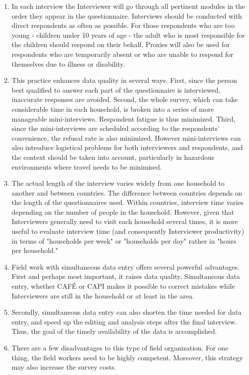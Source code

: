 \documentclass[
]{article}
\begin{document}
\begin{enumerate}
\def\labelenumi{\arabic{enumi}.}
\setcounter{enumi}{354}
\item
  In each interview the Interviewer will go through all pertinent
  modules in the order they appear in the questionnaire. Interviews
  should be conducted with direct respondents as often as possible.
  For those respondents who are too young - children under 10 years of
  age - the adult who is most responsible for the children should
  respond on their behalf. Proxies will also be used for respondents
  who are temporarily absent or who are unable to respond for
  themselves due to illness or disability.
\item
  This practice enhances data quality in several ways. First, since
  the person best qualified to answer each part of the questionnaire
  is interviewed, inaccurate responses are avoided. Second, the whole
  survey, which can take considerable time in each household, is
  broken into a series of more manageable mini-interviews. Respondent
  fatigue is thus minimized. Third, since the mini-interviews are
  scheduled according to the respondents' convenience, the refusal
  rate is also minimized. However mini-interviews can also introduce
  logistical problems for both interviewers and respondents, and the
  context should be taken into account, particularly in hazardous
  environments where travel needs to be minimised.
\item
  The actual length of the interview varies widely from one household
  to another and between countries. The difference between countries
  depends on the length of the questionnaires used. Within countries,
  interview time varies depending on the number of people in the
  household. However, given that Interviewers generally need to visit
  each household several times, it is more useful to evaluate
  interview time (and consequently Interviewer productivity) in terms
  of "households per week" or "households per day" rather in
  "hours per household."
\item
  Field work with simultaneous data entry offers several powerful
  advantages. First and perhaps most important, it raises data
  quality. Simultaneous data entry, whether CAFÉ or CAPI makes it
  possible to correct mistakes while Interviewers are still in the
  household or at least in the area.
\item
  Secondly, simultaneous data entry can also shorten the time needed
  for data entry, and speed up the editing and analysis steps after
  the final interview. Thus, the goal of the timely availability of
  the data is accomplished.
\item
  There are a few disadvantages to this type of field organization.
  For one thing, the field workers need to be highly competent.
  Moreover, this strategy may also increase the survey costs.
\end{enumerate}
\end{document}
